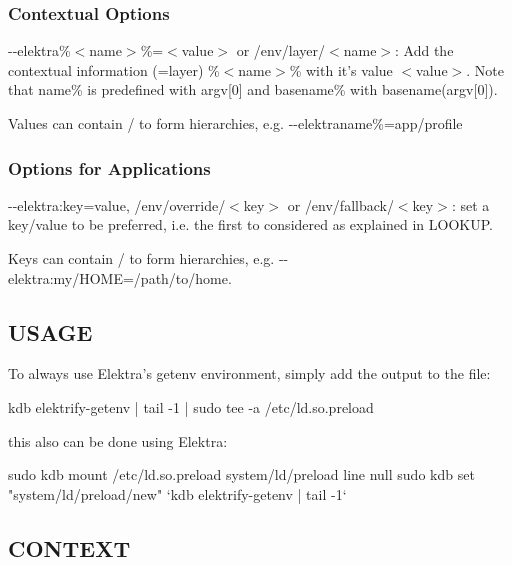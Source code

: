 \subsubsection*{Contextual Options}


\begin{DoxyItemize}
\item {\ttfamily -\/-\/elektra\%$<$name$>$\%=$<$value$>$} or {\ttfamily /env/layer/$<$name$>$}\+: Add the contextual information (=layer) {\ttfamily \%$<$name$>$\%} with it's value {\ttfamily $<$value$>$}. Note that {\ttfamily name\%} is predefined with {\ttfamily argv\mbox{[}0\mbox{]}} and {\ttfamily basename\%} with {\ttfamily basename(argv\mbox{[}0\mbox{]})}.
\end{DoxyItemize}

Values can contain / to form hierarchies, e.\+g. {\ttfamily -\/-\/elektraname\%=app/profile}

\subsubsection*{Options for Applications}


\begin{DoxyItemize}
\item {\ttfamily -\/-\/elektra\+:key=value}, {\ttfamily /env/override/$<$key$>$} or {\ttfamily /env/fallback/$<$key$>$}\+: set a key/value to be preferred, i.\+e. the first to considered as explained in L\+O\+O\+K\+U\+P.
\end{DoxyItemize}

Keys can contain / to form hierarchies, e.\+g. {\ttfamily -\/-\/elektra\+:my/\+H\+O\+M\+E=/path/to/home}.

\subsection*{U\+S\+A\+G\+E}

To always use Elektra's getenv environment, simply add the output to the file\+: \begin{DoxyVerb}kdb elektrify-getenv | tail -1 | sudo tee -a /etc/ld.so.preload
\end{DoxyVerb}


this also can be done using Elektra\+: \begin{DoxyVerb}sudo kdb mount /etc/ld.so.preload system/ld/preload line null
sudo kdb set "system/ld/preload/new"  `kdb elektrify-getenv | tail -1`
\end{DoxyVerb}


\subsection*{C\+O\+N\+T\+E\+X\+T}

